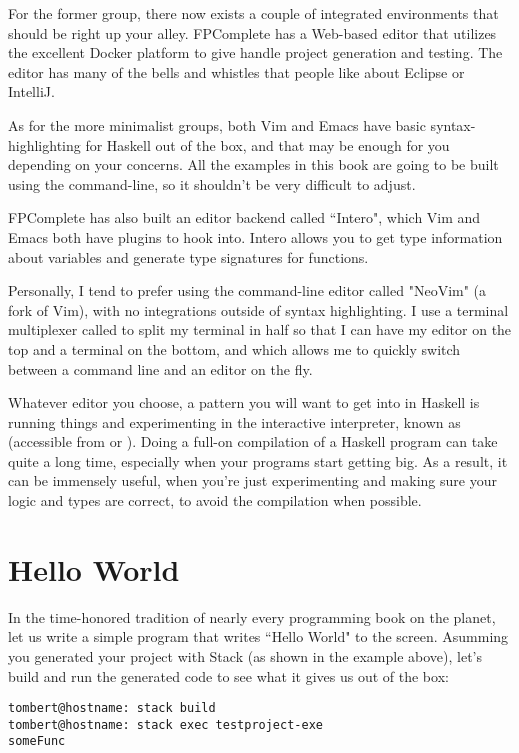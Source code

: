 For the former group, there now exists a couple of integrated environments that should be right up your alley. FPComplete has a Web-based editor that utilizes the excellent Docker platform to give handle project generation and testing. The editor has many of the bells and whistles that people like about Eclipse or IntelliJ. 

As for the more minimalist groups, both Vim and Emacs have basic syntax-highlighting for Haskell out of the box, and that may be enough for you depending on your concerns.  All the examples in this book are going to be built using the command-line, so it shouldn't be very difficult to adjust. 

FPComplete has also built an editor backend called ``Intero", which Vim and Emacs both have plugins to hook into.  Intero allows you to get type information about variables and generate type signatures for functions. 

Personally, I tend to prefer using the command-line editor called "NeoVim" (a fork of Vim), with no integrations outside of syntax highlighting. I use a terminal multiplexer called  to split my terminal in half so that I can have my editor on the top and a terminal on the bottom, and which allows me to quickly switch between a command line and an editor on the fly.  

Whatever editor you choose, a pattern you will want to get into in Haskell is running things and experimenting in the interactive interpreter, known as  (accessible from  or ). Doing a full-on compilation of a Haskell program can take quite a long time, especially when your programs start getting big.  As a result, it can be immensely useful, when you're just experimenting and making sure your logic and types are correct, to avoid the compilation when possible. 

\section{Hello World}

In the time-honored tradition of nearly every programming book on the planet, let us write a simple program that writes ``Hello World" to the screen.  Asumming you generated your project with Stack (as shown in the example above), let's build and run the generated code to see what it gives us out of the box:  

\begin{verbatim}
tombert@hostname: stack build
tombert@hostname: stack exec testproject-exe
someFunc 
\end{verbatim}

